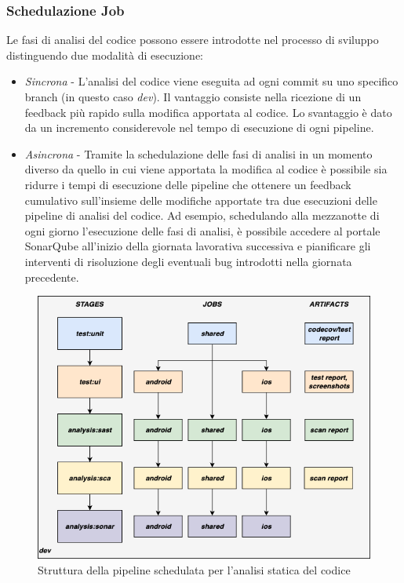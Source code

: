 \subsubsection{Schedulazione Job}
Le fasi di analisi del codice possono essere introdotte nel processo di sviluppo distinguendo due modalità di esecuzione:
\begin{itemize}
    \item \textit{Sincrona} - L'analisi del codice viene eseguita ad ogni commit su uno specifico branch (in questo caso \textit{dev}). Il vantaggio consiste nella ricezione di un feedback più rapido sulla modifica apportata al codice. Lo svantaggio è dato da un incremento considerevole nel tempo di esecuzione di ogni pipeline.
    \item \textit{Asincrona} - Tramite la schedulazione delle fasi di analisi in un momento diverso da quello in cui viene apportata la modifica al codice è possibile sia ridurre i tempi di esecuzione delle pipeline che ottenere un feedback cumulativo sull'insieme delle modifiche apportate tra due esecuzioni delle pipeline di analisi del codice. Ad esempio, schedulando alla mezzanotte di ogni giorno l'esecuzione delle fasi di analisi, è possibile accedere al portale SonarQube all'inizio della giornata lavorativa successiva e pianificare gli interventi di risoluzione degli eventuali bug introdotti nella giornata precedente.
\end{itemize}

\begin{figure}[H]
\centering
\includegraphics[width=1\textwidth]{img/tesi-16-cicd-scheduled.drawio.png}
\caption{Struttura della pipeline schedulata per l'analisi statica del codice}
\end{figure}

